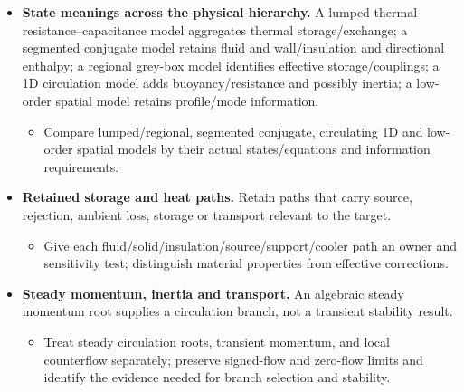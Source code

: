\begin{itemize}[leftmargin=*]
\item {}\textbf{State meanings across the physical hierarchy.} A lumped thermal resistance--capacitance model aggregates thermal storage/\allowbreak{}exchange; a segmented conjugate model retains fluid and wall/\allowbreak{}insulation and directional enthalpy; a regional grey-box model identifies effective storage/\allowbreak{}couplings; a 1D circulation model adds buoyancy/\allowbreak{}resistance and possibly inertia; a low-order spatial model retains profile/\allowbreak{}mode information.
\begin{itemize}
\item Compare lumped/\allowbreak{}regional, segmented conjugate, circulating 1D and low-order spatial models by their actual states/\allowbreak{}equations and information requirements.
\end{itemize}
\item {}\textbf{Retained storage and heat paths.} Retain paths that carry source, rejection, ambient loss, storage or transport relevant to the target.
\begin{itemize}
\item Give each fluid/\allowbreak{}solid/\allowbreak{}insulation/\allowbreak{}source/\allowbreak{}support/\allowbreak{}cooler path an owner and sensitivity test; distinguish material properties from effective corrections.
\end{itemize}
\item {}\textbf{Steady momentum, inertia and transport.} An algebraic steady momentum root supplies a circulation branch, not a transient stability result.
\begin{itemize}
\item Treat steady circulation roots, transient momentum, and local counterflow separately; preserve signed-flow and zero-flow limits and identify the evidence needed for branch selection and stability.
\end{itemize}
\end{itemize}

